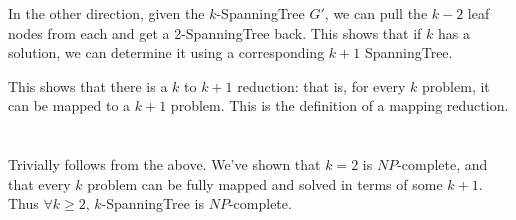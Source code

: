 \documentclass[a4paper]{article}
\begin{document}
In the other direction, given the $k$-SpanningTree $G'$, we can pull the $k-2$ leaf nodes from each and get a 2-SpanningTree back. This shows that if $k$ has a solution, we can determine it using a corresponding $k+1$ SpanningTree.

This shows that there is a $k$ to $k+1$ reduction: that is, for every $k$ problem, it can be mapped to a $k+1$ problem. This is the definition of a mapping reduction.

\section{}

Trivially follows from the above. We've shown that $k=2$ is $NP$-complete, and that every $k$ problem can be fully mapped and solved in terms of some $k+1$. Thus $\forall k \ge 2$, $k$-SpanningTree is $NP$-complete.
\end{document}

